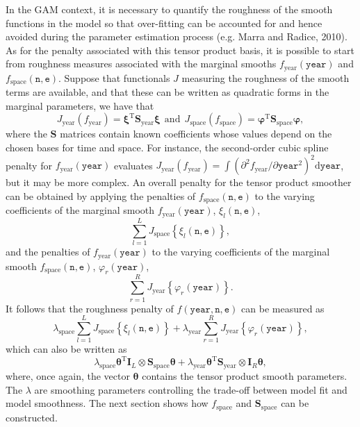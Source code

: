 In the GAM context, it is necessary to quantify the roughness of the smooth functions in the model so that over-fitting can be accounted for and hence avoided during the parameter estimation process (e.g. Marra and Radice, 2010). As for the penalty associated with this tensor product basis, it is possible to start from roughness measures associated with the marginal smooths $f_\text{year}(\texttt{year})$ and $f_\text{space}(\texttt{n},\texttt{e})$. Suppose that functionals $J$ measuring the roughness of the smooth terms are available, and that these can be written as quadratic forms in the marginal parameters, we have that
$$
J_\text{year}(f_\text{year})=\bm\xi^\text{T}\textbf{S}_\text{year}\bm\xi \ \ \text{and} \ \ J_\text{space}(f_\text{space})=\bm\varphi^\text{T}\textbf{S}_\text{space}\bm\varphi,
$$
where the $\textbf{S}$ matrices contain known coefficients whose values depend on the chosen bases for time and space. For instance, the second-order cubic spline penalty for $f_\text{year}(\texttt{year})$ evaluates $J_\text{year}(f_\text{year})=\int\left( \partial^2 f_\text{year}/\partial \texttt{year}^2 \right)^2 \text{d}\texttt{year}$, but it may be more complex. An overall penalty for the tensor product smoother can be obtained by applying the penalties of $f_\text{space}(\texttt{n},\texttt{e})$ to the varying coefficients of the marginal smooth $f_\text{year}(\texttt{year})$, $\xi_l(\texttt{n},\texttt{e})$,
$$
\sum_{l=1}^L J_\text{space}\left\{  \xi_l(\texttt{n},\texttt{e}) \right\},
$$ 
and the penalties of $f_\text{year}(\texttt{year})$ to the varying coefficients of the marginal smooth $f_\text{space}(\texttt{n},\texttt{e})$, $\varphi_r(\texttt{year})$,  
$$
\sum_{r=1}^R J_\text{year}\left\{  \varphi_r(\texttt{year}) \right\}.
$$ 
It follows that the roughness penalty of $f(\texttt{year},\texttt{n},\texttt{e})$ can be measured as 
$$
\lambda_\text{space} \sum_{l=1}^L J_\text{space}\left\{  \xi_l(\texttt{n},\texttt{e}) \right\} + \lambda_\text{year} \sum_{r=1}^R J_\text{year}\left\{  \varphi_r(\texttt{year}) \right\},
$$
which can also be written as
\begin{equation}
\lambda_\text{space} \bm\theta^\text{T} \textbf{I}_L \otimes \textbf{S}_\text{space} \bm\theta + \lambda_\text{year} \bm\theta^\text{T} \textbf{S}_\text{year} \otimes \textbf{I}_R  \bm\theta,
\label{TensProd}
\end{equation}
where, once again, the vector $\bm\theta$ contains the tensor product smooth parameters. The $\lambda$ are smoothing parameters controlling the trade-off between model fit and model smoothness. The next section shows how $f_\text{space}$ and $\textbf{S}_\text{space}$ can be constructed.   

